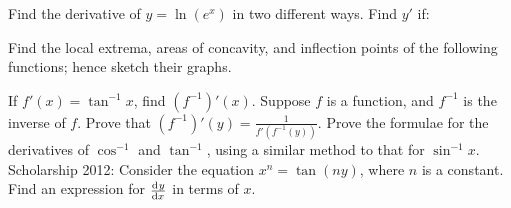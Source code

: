 \begin{questions}
  \questioA Find the derivative of $ y = \ln(e^x) $ in two different ways.
  \questioA Find $ y' $ if:
  \questioE Find the local extrema, areas of concavity, and inflection points of the following functions; hence sketch their graphs.
  \questioE If $ f'(x) = \tan^{-1} x $, find $ (f^{-1})'(x) $.
  \questioE Suppose $ f $ is a function, and $ f^{-1} $ is the inverse of $ f $. Prove that $ (f^{-1})'(y) = \frac{1}{f'(f^{-1}(y))} $.
  \questioS Prove the formulae for the derivatives of $ \cos^{-1} $ and $ \tan^{-1} $, using a similar method to that for $ \sin^{-1} x $.
  \questioS Scholarship 2012: Consider the equation $ x^n = \tan(ny) $, where $ n $ is a constant. Find an expression
            for $ \od{y}{x} $ in terms of $ x $.
\end{questions}

